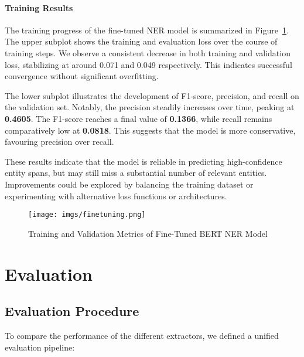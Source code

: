 \subsubsection{Training Results}

The training progress of the fine-tuned NER model is summarized in Figure~\ref{fig:training-results}. The upper subplot shows the training and evaluation loss over the course of training steps. We observe a consistent decrease in both training and validation loss, stabilizing at around 0.071 and 0.049 respectively. This indicates successful convergence without significant overfitting.

The lower subplot illustrates the development of F1-score, precision, and recall on the validation set. Notably, the precision steadily increases over time, peaking at \textbf{0.4605}. The F1-score reaches a final value of \textbf{0.1366}, while recall remains comparatively low at \textbf{0.0818}. This suggests that the model is more conservative, favouring precision over recall.

These results indicate that the model is reliable in predicting high-confidence entity spans, but may still miss a substantial number of relevant entities. Improvements could be explored by balancing the training dataset or experimenting with alternative loss functions or architectures.

\begin{figure}[H]
    \centering
    \texttt{[image: imgs/finetuning.png]}
    \caption{Training and Validation Metrics of Fine-Tuned BERT NER Model}
    \label{fig:training-results}
\end{figure}


\chapter{Evaluation}
\label{ch:Evaluation}

\section{Evaluation Procedure}

To compare the performance of the different extractors, we defined a unified evaluation pipeline:


